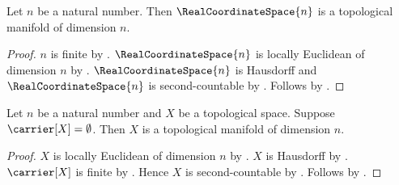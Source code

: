 \begin{theorem}\label{real_coordinate_space_is_topological_manifold}
    Let $n$ be a natural number.
    Then $\RealCoordinateSpace{n}$ is a topological manifold of dimension $n$.
\end{theorem}
\begin{proof}
    $n$ is finite by .
    $\RealCoordinateSpace{n}$ is locally Euclidean of dimension $n$ by
        .
    $\RealCoordinateSpace{n}$ is Hausdorff and $\RealCoordinateSpace{n}$ is second-countable by
        .
    Follows by .
\end{proof}

\begin{theorem}\label{empty_space_is_topological_manifold}
    Let $n$ be a natural number and $X$ be a topological space.
    Suppose $\carrier[X]=\emptyset$.
    Then $X$ is a topological manifold of dimension $n$.
\end{theorem}
\begin{proof}
    $X$ is locally Euclidean of dimension $n$ by .
    $X$ is Hausdorff by .
    $\carrier[X]$ is finite by .
    Hence $X$ is second-countable by .
    Follows by .
\end{proof}
